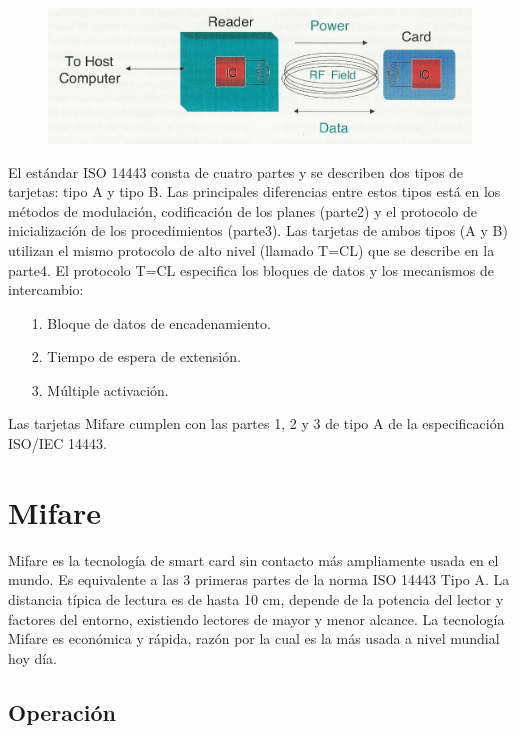\begin{figure}[H]
\centering
  \begin{center}
  \includegraphics[scale=.2]{Imagenes/sc2.jpg} 
  \end{center}
  \caption{}\label{Fig:HW} 
\end{figure}

El estándar ISO 14443 consta de cuatro partes y se describen dos tipos de tarjetas: tipo A y tipo B. Las principales diferencias entre estos tipos está en los métodos de modulación, codificación de los planes (parte2) y el protocolo de inicialización de los procedimientos (parte3). Las tarjetas de ambos tipos (A y B) utilizan el mismo protocolo de alto nivel (llamado T=CL) que se describe en la parte4. El protocolo T=CL especifica los bloques de datos y los mecanismos de intercambio:

\begin{itemize}
\item[1.] Bloque de datos de encadenamiento.
\item[2.] Tiempo de espera de extensión.
\item[3.] Múltiple activación.
\end{itemize}

Las tarjetas Mifare cumplen con las partes 1, 2 y 3 de tipo A de la especificación ISO/IEC 14443.


\section{Mifare}

Mifare es la tecnología de smart card sin contacto más ampliamente usada en el mundo. Es equivalente a las 3 primeras partes de la norma ISO 14443 Tipo A. La distancia típica de lectura es de hasta 10 cm, depende de la potencia del lector y factores del entorno, existiendo lectores de mayor y menor alcance.
La tecnología Mifare es económica y rápida, razón por la cual es la más usada a nivel mundial hoy día.


\subsection{Operación}


